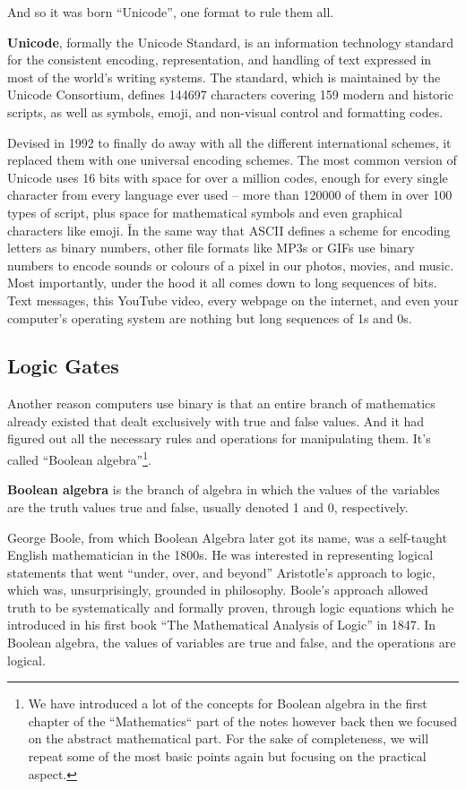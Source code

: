And so it was born ``Unicode'', one format to rule them all.

\bd[Unicode]
\textbf{Unicode}, formally the Unicode Standard, is an information technology standard for the consistent encoding,
representation, and handling of text expressed in most of the world's writing systems. The standard, which is
maintained by the Unicode Consortium, defines 144697 characters covering 159 modern and historic scripts, as well as
symbols, emoji, and non-visual control and formatting codes.
\ed

Devised in 1992 to finally do away with all the different international schemes, it replaced them with one
universal encoding schemes. The most common version of Unicode uses 16 bits with space for over a million codes,
enough for every single character from every language ever used – more than 120000 of them in over 100 types of
script, plus space for mathematical symbols and even graphical characters like emoji. \v

In the same way that ASCII defines a scheme for encoding letters as binary numbers, other file formats like MP3s or
GIFs use binary numbers to encode sounds or colours of a pixel in our photos, movies, and music. Most importantly,
under the hood it all comes down to long sequences of bits. Text messages, this YouTube video, every webpage on the
internet, and even your computer's operating system are nothing but long sequences of 1s and 0s.

\subsection{Logic Gates}

Another reason computers use binary is that an entire branch of mathematics already existed that dealt exclusively
with true and false values. And it had figured out all the necessary rules and operations for manipulating them.
It's called ``Boolean algebra''\footnote{We have introduced a lot of the concepts for Boolean algebra in the first
chapter of the ``Mathematics`` part of the notes however back then we focused on the abstract mathematical part. For
the sake of completeness, we will repeat some of the most basic points again but focusing on the practical aspect.}.

\textbf{Boolean algebra}  is the branch of algebra in which the values of the variables are the truth values true and
false, usually denoted 1 and 0, respectively.
\ed

George Boole, from which Boolean Algebra later got its name, was a self-taught English mathematician in the 1800s. He
was interested in representing logical statements that went ``under, over, and beyond'' Aristotle's approach to logic,
which was, unsurprisingly, grounded in philosophy. Boole's approach allowed truth to be systematically and formally
proven, through logic equations which he introduced in his first book ``The Mathematical Analysis of Logic'' in 1847.
In Boolean algebra, the values of variables are true and false, and the operations are logical.

